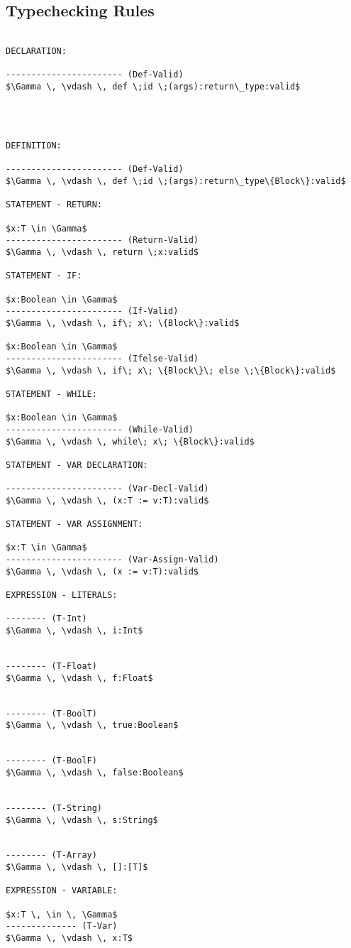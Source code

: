 \documentclass[11pt, a4paper]{article}
\begin{document}
\subsection*{Typechecking Rules}
\begin{lstlisting}

DECLARATION:

----------------------- (Def-Valid)
$\Gamma \, \vdash \, def \;id \;(args):return\_type:valid$




DEFINITION:

----------------------- (Def-Valid)
$\Gamma \, \vdash \, def \;id \;(args):return\_type\{Block\}:valid$

STATEMENT - RETURN:

$x:T \in \Gamma$
----------------------- (Return-Valid)
$\Gamma \, \vdash \, return \;x:valid$

STATEMENT - IF:

$x:Boolean \in \Gamma$
----------------------- (If-Valid)
$\Gamma \, \vdash \, if\; x\; \{Block\}:valid$

$x:Boolean \in \Gamma$
----------------------- (Ifelse-Valid)
$\Gamma \, \vdash \, if\; x\; \{Block\}\; else \;\{Block\}:valid$

STATEMENT - WHILE:

$x:Boolean \in \Gamma$
----------------------- (While-Valid)
$\Gamma \, \vdash \, while\; x\; \{Block\}:valid$

STATEMENT - VAR DECLARATION:

----------------------- (Var-Decl-Valid)
$\Gamma \, \vdash \, (x:T := v:T):valid$

STATEMENT - VAR ASSIGNMENT:

$x:T \in \Gamma$
----------------------- (Var-Assign-Valid)
$\Gamma \, \vdash \, (x := v:T):valid$

EXPRESSION - LITERALS:

-------- (T-Int)
$\Gamma \, \vdash \, i:Int$


-------- (T-Float)
$\Gamma \, \vdash \, f:Float$


-------- (T-BoolT)
$\Gamma \, \vdash \, true:Boolean$


-------- (T-BoolF)
$\Gamma \, \vdash \, false:Boolean$


-------- (T-String)
$\Gamma \, \vdash \, s:String$


-------- (T-Array)
$\Gamma \, \vdash \, []:[T]$

EXPRESSION - VARIABLE:

$x:T \, \in \, \Gamma$
-------------- (T-Var)
$\Gamma \, \vdash \, x:T$



\end{lstlisting}
\end{document}
